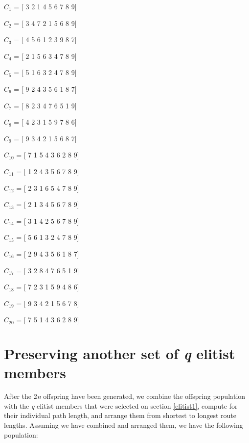 $C_{1}$ = [ 3 2 1 4 5 6 7 8 9] \par 
$C_{2}$ = [ 3 4 7 2 1 5 6 8 9] \par 
$C_{3}$ = [ 4 5 6 1 2 3 9 8 7] \par 
$C_{4}$ = [ 2 1 5 6 3 4 7 8 9] \par
$C_{5}$ = [ 5 1 6 3 2 4 7 8 9] \par 
$C_{6}$ = [ 9 2 4 3 5 6 1 8 7] \par 
$C_{7}$ = [ 8 2 3 4 7 6 5 1 9] \par 
$C_{8}$ = [ 4 2 3 1 5 9 7 8 6] \par 
$C_{9}$ = [ 9 3 4 2 1 5 6 8 7] \par
$C_{10}$ = [ 7 1 5 4 3 6 2 8 9] \par 
$C_{11}$ = [ 1 2 4 3 5 6 7 8 9] \par 
$C_{12}$ = [ 2 3 1 6 5 4 7 8 9] \par 
$C_{13}$ = [ 2 1 3 4 5 6 7 8 9] \par 
$C_{14}$ = [ 3 1 4 2 5 6 7 8 9] \par 
$C_{15}$ = [ 5 6 1 3 2 4 7 8 9] \par 
$C_{16}$ = [ 2 9 4 3 5 6 1 8 7] \par 
$C_{17}$ = [ 3 2 8 4 7 6 5 1 9] \par 
$C_{18}$ = [ 7 2 3 1 5 9 4 8 6] \par 
$C_{19}$ = [ 9 3 4 2 1 5 6 7 8] \par
$C_{20}$ = [ 7 5 1 4 3 6 2 8 9] \par 

\section{Preserving another set of \emph{q} elitist members} \label{elitist2}
\indent \indent After the 2\emph{n} offspring have been generated, we combine the offspring population with the \emph{q} elitist members that were selected on section \ref{elitist1}, compute for their individual path length, and arrange them from shortest to longest route lengths. Assuming we have combined and arranged them, we have the following population: \par

